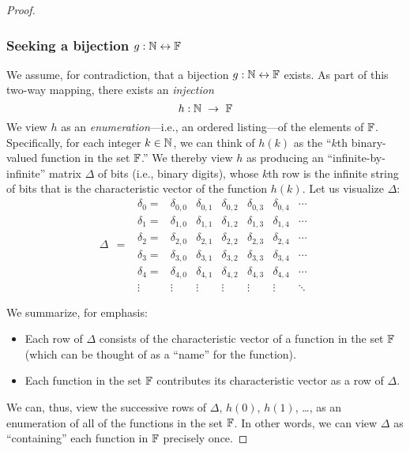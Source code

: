 \begin{proof}
\subsubsection{Seeking a bijection $g: \mathbb{N} \leftrightarrow \mathbb{F}$}

We assume, for contradiction, that a bijection $g: \mathbb{N} \leftrightarrow
\mathbb{F}$ exists.  As part of this two-way mapping, there exists an {\em
  injection}
\[ 
h: \N \ \rightarrow \ \F
\]
We view $h$ as an {\em enumeration}---i.e., an ordered listing---of
the elements of $\mathbb{F}$.  Specifically, for each integer $k \in \mathbb{N}$, we
can think of $h(k)$ as the ``$k$th binary-valued function in the set
$\mathbb{F}$.''  We thereby view $h$ as producing an ``infinite-by-infinite''
matrix $\Delta$ of bits (i.e., binary digits), whose $k$th row is the
infinite string of bits that is the characteristic vector of the
function $h(k)$.  Let us visualize $\Delta$:
\[ \Delta \ \ = \ \
\begin{array}{ccccccc}
\delta_0 = &
\delta_{0,0} & \delta_{0,1} & \delta_{0,2} & \delta_{0,3} &
	\delta_{0,4} & \cdots \\
\delta_1 = &
\delta_{1,0} & \delta_{1,1} & \delta_{1,2} & \delta_{1,3} &
	\delta_{1,4} & \cdots \\
\delta_2 = &
\delta_{2,0} & \delta_{2,1} & \delta_{2,2} & \delta_{2,3} &
	\delta_{2,4} & \cdots \\
\delta_3 = &
\delta_{3,0} & \delta_{3,1} & \delta_{3,2} & \delta_{3,3} &
	\delta_{3,4} & \cdots \\ 
\delta_4 = &
\delta_{4,0} & \delta_{4,1} & \delta_{4,2} & \delta_{4,3} &
	\delta_{4,4} & \cdots \\ 
\vdots &
\vdots  & \vdots  & \vdots  & \vdots  & \vdots  & \ddots
\end{array}
\]

\noindent We summarize, for emphasis:
\begin{itemize}
\item
Each row of $\Delta$ consists of the characteristic vector of a
function in the set $\mathbb{F}$ (which can be thought of as a ``name'' for
the function).

\item
Each function in the set $\mathbb{F}$ contributes its characteristic vector as
a row of $\Delta$.
\end{itemize}
We can, thus, view the successive rows of $\Delta$, $h(0)$, $h(1)$,
\ldots, as an enumeration of all of the functions in the set $\mathbb{F}$.  In
other words, we can view $\Delta$ as ``containing'' each function in
$\mathbb{F}$ precisely once.


\end{proof}
